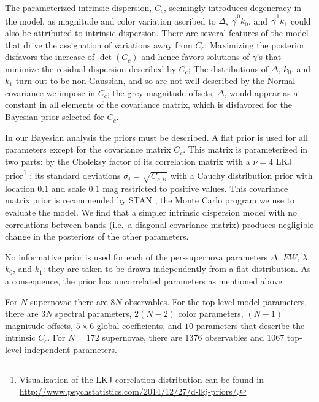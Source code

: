 \documentclass{aastex61}   	%
\begin{document}
The parameterized intrinsic dispersion, $C_c$, seemingly introduces degeneracy in the model, as magnitude and color variation
ascribed to $\Delta$, $\vec{\gamma}^0 k_0$, and $\vec{\gamma}^1 k_1$ could also be attributed to intrinsic dispersion.  There are several features of the model
that drive the assignation of variations away from $C_c$:  Maximizing the posterior disfavors the increase of $\det{(C_c)}$
\color{red}
and hence favors solutions of $\gamma$'s that minimize the residual dispersion described by $C_c$;
\color{black}
The distributions of $\Delta$, $k_0$, and $k_1$ turn out to
be non-Gaussian, and so are not well described by the Normal covariance we impose in $C_c$; the grey magnitude offsets, $\Delta$, would appear as a constant
in all elements of the covariance matrix, which is disfavored for the Bayesian prior selected for $C_c$.



In our Bayesian analysis the priors must be described.  A flat prior is used for all parameters except
for the covariance matrix $C_c$.
\color{red}
This matrix is parameterized in two parts: by the Choleksy factor of its
\color{black}
correlation matrix with a $\nu=4$  LKJ prior\footnote{
Visualization of the LKJ correlation distribution can be found in \url{http://www.psychstatistics.com/2014/12/27/d-lkj-priors/}.}
\citep{Lewandowski20091989}; its standard
deviations $\sigma_i = \sqrt{C_{c,ii}}$ with a  Cauchy distribution prior with location
 $0.1$ and scale $0.1$ mag restricted to positive values.
This covariance matrix prior is recommended by STAN \citep{stan}, the Monte Carlo program we use to evaluate the model.
 We find that a simpler intrinsic dispersion model with no correlations between bands
 (i.e.\ a  diagonal covariance matrix) produces \color{red} negligible \color{black} change in the posteriors of
 the other parameters.

No informative prior is used for each of the per-supernova parameters $\Delta$, $EW$, $\lambda$, $k_0$, and $k_1$:
they are taken to be drawn independently from a flat distribution. 
As a consequence, the prior has uncorrelated parameters as mentioned above.  

For $N$ supernovae there are $8N$ observables.  For the top-level model parameters, there are $3N$ spectral parameters, $2(N-2)$
color parameters, $(N-1)$ magnitude offsets,  $5 \times 6$ global coefficients, and $10$ parameters that describe the intrinsic
$C_c$.  For $N=172$ supernovae, there are 1376 observables and 1067 top-level independent parameters.
\end{document}

